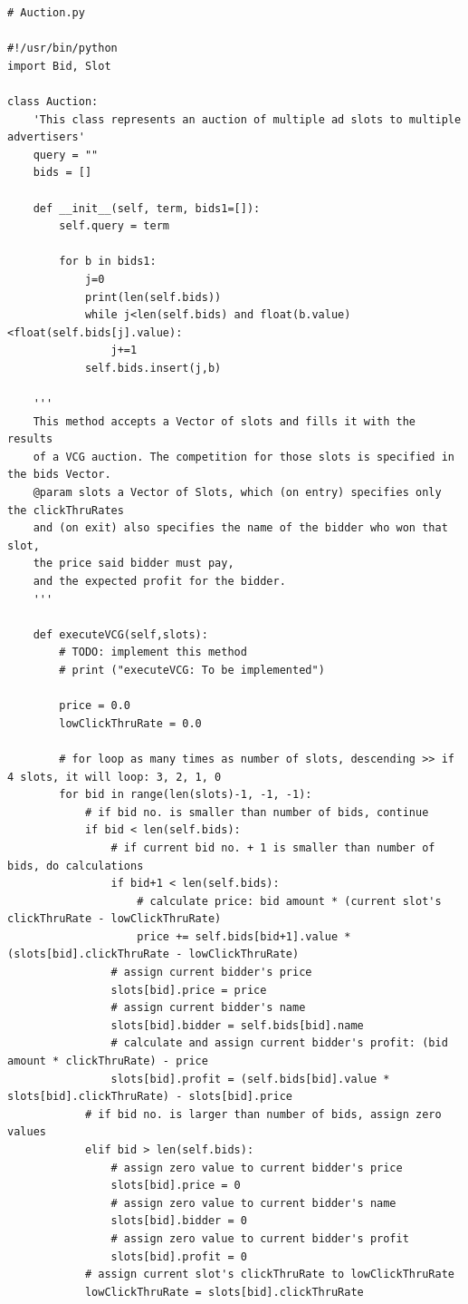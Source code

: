 \documentclass{article} %
\begin{document}
\begin{lstlisting}
# Auction.py

#!/usr/bin/python
import Bid, Slot

class Auction:
	'This class represents an auction of multiple ad slots to multiple advertisers'
	query = ""
	bids = []

	def __init__(self, term, bids1=[]):
		self.query = term

		for b in bids1:
			j=0
			print(len(self.bids))
			while j<len(self.bids) and float(b.value) <float(self.bids[j].value):
				j+=1
			self.bids.insert(j,b)

	'''
	This method accepts a Vector of slots and fills it with the results
	of a VCG auction. The competition for those slots is specified in the bids Vector.
	@param slots a Vector of Slots, which (on entry) specifies only the clickThruRates
	and (on exit) also specifies the name of the bidder who won that slot,
	the price said bidder must pay,
	and the expected profit for the bidder.  
	'''

	def executeVCG(self,slots):
		# TODO: implement this method
		# print ("executeVCG: To be implemented")

		price = 0.0
		lowClickThruRate = 0.0

		# for loop as many times as number of slots, descending >> if 4 slots, it will loop: 3, 2, 1, 0
		for bid in range(len(slots)-1, -1, -1):
			# if bid no. is smaller than number of bids, continue
			if bid < len(self.bids):
				# if current bid no. + 1 is smaller than number of bids, do calculations
				if bid+1 < len(self.bids):
					# calculate price: bid amount * (current slot's clickThruRate - lowClickThruRate)
					price += self.bids[bid+1].value * (slots[bid].clickThruRate - lowClickThruRate)
				# assign current bidder's price
				slots[bid].price = price
				# assign current bidder's name
				slots[bid].bidder = self.bids[bid].name
				# calculate and assign current bidder's profit: (bid amount * clickThruRate) - price
				slots[bid].profit = (self.bids[bid].value * slots[bid].clickThruRate) - slots[bid].price
			# if bid no. is larger than number of bids, assign zero values
			elif bid > len(self.bids):
				# assign zero value to current bidder's price
				slots[bid].price = 0
				# assign zero value to current bidder's name
				slots[bid].bidder = 0
				# assign zero value to current bidder's profit
				slots[bid].profit = 0
			# assign current slot's clickThruRate to lowClickThruRate
			lowClickThruRate = slots[bid].clickThruRate
\end{lstlisting}

\printbibliography
\end{document}
